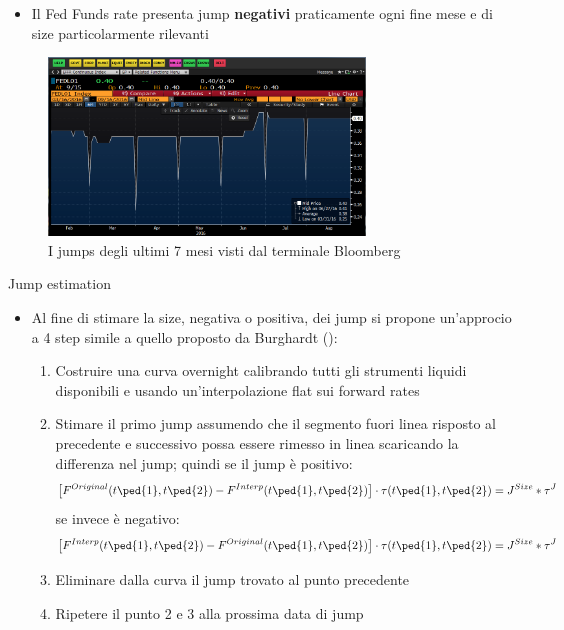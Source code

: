 \begin{tframe}
\begin{itemize}
\item Il Fed Funds rate presenta jump {\bfseries negativi} praticamente ogni fine mese e di size particolarmente rilevanti
\end{itemize}
\begin{figure}[!h]
\centering
\includegraphics[width=0.75\textwidth]{bloombergusd.png}
\caption{I jumps degli ultimi 7 mesi visti dal terminale Bloomberg}
\label{fig:bloombergusd}
\end{figure}
\end{tframe}
\begin{tframe}{Jump estimation}
\begin{itemize}
\item Al fine di stimare la size, negativa o positiva, dei jump si propone un'approcio a 4 step simile a quello proposto da Burghardt (\cite{burg}):
   \begin{enumerate}
   \item Costruire una curva overnight calibrando tutti gli strumenti liquidi disponibili e usando un'interpolazione flat sui forward rates
   \item Stimare il primo jump assumendo che il segmento fuori linea risposto al precedente e successivo possa essere rimesso in linea scaricando la differenza nel jump; quindi se il jump è positivo:
   $$\left[F^{Original}(t\ped{1},t\ped{2}) - F^{Interp}(t\ped{1},t\ped{2})\right] \cdot \tau(t\ped{1},t\ped{2}) = J^{Size}*\tau^{J}$$
   se invece è negativo:
   $$\left[F^{Interp}(t\ped{1},t\ped{2}) - F^{Original}(t\ped{1},t\ped{2})\right] \cdot \tau(t\ped{1},t\ped{2}) = J^{Size}*\tau^{J}$$
   \item Eliminare dalla curva il jump trovato al punto precedente
   \item Ripetere il punto 2 e 3 alla prossima data di jump
   \end{enumerate}
\end{itemize}
\end{tframe}
